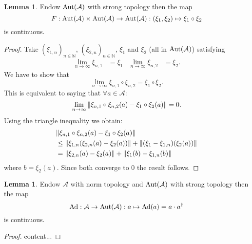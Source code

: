 \documentclass[12pt,a4paper,twoside]{article}
\let\originalleft\left
\let\originalright\right
\renewcommand{\left}{\mathopen{}\mathclose\bgroup\originalleft}
\renewcommand{\right}{\aftergroup\egroup\originalright}
\renewcommand{\AA}{\mathcal A}
\newcommand{\NN}{\mathbb{N}}
\newcommand{\Ad}[1]{\textrm{Ad}\left(#1\right)}
\newcommand{\Aut}[1]{\textrm{Aut}\left(#1\right)}
\theoremstyle{definition}
\newtheorem{lemma}[theorem]{Lemma}
\numberwithin{equation}{section}
\begin{document}
\begin{lemma}\label{lem:AddingAutomorphismsIsContinuous}
	Endow $\Aut{\AA}$ with strong topology then the map
	\begin{equation}
		F:\Aut{\AA}\times\Aut{\AA}\rightarrow\Aut{\AA}:(\xi_1,\xi_2)\mapsto \xi_1\circ\xi_2
	\end{equation}
	is continuous.
\end{lemma}
\begin{proof}
	Take $(\xi_{1,n})_{n\in\NN}$, $(\xi_{2,n})_{n\in\NN}$, $\xi_1$ and $\xi_2$ (all in $\Aut{\AA}$) satisfying
	\begin{align}
		\lim_{n\rightarrow\infty}\xi_{n,1}&=\xi_1&\lim_{n\rightarrow\infty}\xi_{n,2}&=\xi_2.
	\end{align}
	We have to show that
	\begin{equation}
		\lim_{n\rightarrow\infty}\xi_{n,1}\circ\xi_{n,2}=\xi_1\circ\xi_2.
	\end{equation}
	This is equivalent to saying that $\forall a\in\AA:$
	\begin{equation}
		\lim_{n\rightarrow\infty}\norm{\xi_{n,1}\circ\xi_{n,2}(a)-\xi_1\circ\xi_2(a)}=0.
	\end{equation}
	Using the triangle inequality we obtain:
	\begin{align}
		&\norm{\xi_{n,1}\circ\xi_{n,2}(a)-\xi_1\circ\xi_2(a)}\\
		&\leq \norm{\xi_{1,n}\left(\xi_{2,n}(a)-\xi_{2}(a)\right)}+\norm{(\xi_1-\xi_{1,n})(\xi_2(a))}\\
		&=\norm{\xi_{2,n}(a)-\xi_{2}(a)}+\norm{\xi_1(b)-\xi_{1,n}(b)}
	\end{align}
	where $b=\xi_2(a).$ Since both converge to $0$ the result follows.
\end{proof}
\begin{lemma}\label{lem:AdjointIsContinuous}
	Endow $\AA$ with norm topology and $\Aut{\AA}$ with strong topology then the map
	\begin{equation}
		\text{Ad}:\AA\rightarrow \Aut{\AA}:a\mapsto \Ad{a}= a\cdot a^\dagger
	\end{equation}
	is continuous.
\end{lemma}
\begin{proof}
	content...
\end{proof}
\end{document}
